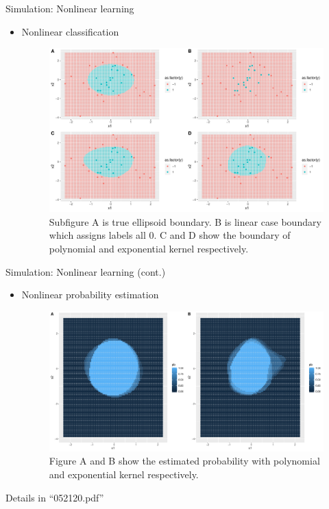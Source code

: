 \documentclass[compress,dvipsnames]{beamer}
\let\olditem\item
\renewcommand\item{\olditem\justifying}
\begin{document}
\begin{frame}{Simulation: Nonlinear learning}
\begin{itemize}
\item Nonlinear classification
\begin{figure}[H]
\centering
\includegraphics[width=.7\textwidth]{SMMK_boundary.pdf}
\caption{\scriptsize Subfigure A is true ellipsoid boundary. B is linear case boundary which assigns labels all 0. C and D show the boundary of polynomial and exponential kernel respectively.}
\end{figure}
\end{itemize}
\end{frame}


\begin{frame}{Simulation: Nonlinear learning (cont.)}
\begin{itemize}
\item Nonlinear probability estimation
\begin{figure}[H]
\centering
\includegraphics[width=.7\textwidth]{SMMK_condpb.pdf}
\caption{\scriptsize Figure A and B show the estimated probability with polynomial and exponential kernel respectively. }
\end{figure}
\end{itemize}
{\scriptsize Details in ``052120.pdf''}
\end{frame}
\end{document}
